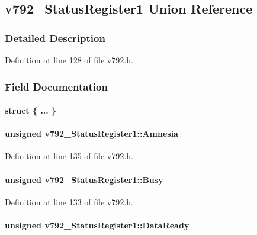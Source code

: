 \subsection{v792\_\-StatusRegister1 Union Reference}
\label{unionv792__StatusRegister1}


\subsubsection{Detailed Description}


Definition at line 128 of file v792.h.

\subsubsection{Field Documentation}
\paragraph[{"@2}]{\setlength{\rightskip}{0pt plus 5cm}struct \{ ... \} }\hfill\label{unionv792__StatusRegister1_a3323765d5cbb993d59910e21270416d5}
\paragraph[{Amnesia}]{\setlength{\rightskip}{0pt plus 5cm}unsigned {\bf v792\_\-StatusRegister1::Amnesia}}\hfill\label{unionv792__StatusRegister1_ab5a54c8e195feb90b2c3bbdfa4a3b8d9}


Definition at line 135 of file v792.h.
\paragraph[{Busy}]{\setlength{\rightskip}{0pt plus 5cm}unsigned {\bf v792\_\-StatusRegister1::Busy}}\hfill\label{unionv792__StatusRegister1_a5e0f14658271212e29037de93337dc18}


Definition at line 133 of file v792.h.
\paragraph[{DataReady}]{\setlength{\rightskip}{0pt plus 5cm}unsigned {\bf v792\_\-StatusRegister1::DataReady}}\hfill\label{unionv792__StatusRegister1_aa2ff2be741bd450ca034cad278d0a5ad}


